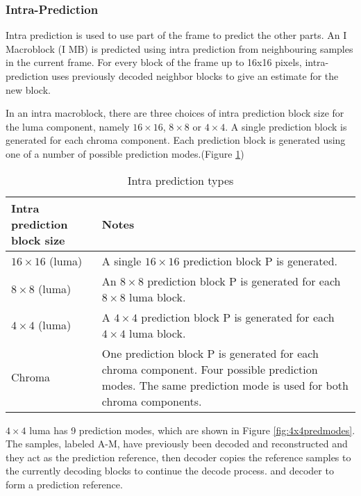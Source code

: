 \documentclass[../main.tex]{subfiles}
\begin{document}
\subsubsection{ Intra-Prediction }

Intra prediction is used to use part of the frame
to predict the other parts. An I Macroblock (I MB) is predicted using intra prediction from neighbouring samples in the current frame. For every block of the frame up to 16x16 pixels, intra-prediction uses previously decoded neighbor blocks to give an estimate for the new
block. 

In an intra macroblock, there are three choices of intra prediction block size for the luma
component, namely $16 \times 16$, $8 \times 8$ or $4 \times 4$. A single prediction block is generated for each
chroma component. Each prediction block is generated using one of a number of possible
prediction modes.(Figure \ref{tab:predtypes}) 

\begin{table}[ht]
\label{tab:predtypes}
\begin{center}       
\begin{tabular}{|l|p{10cm}|} 
\hline
\rule[-1ex]{0pt}{3.5ex}  Intra prediction block size & Notes\\  
\hline
\rule[-1ex]{0pt}{3.5ex}  $16 \times 16$ (luma) &  A single $16 \times 16$ prediction block P is generated.   \\
\hline
\rule[-1ex]{0pt}{3.5ex}  $8 \times 8$ (luma) & An $8 \times 8$ prediction block P is generated for each $8 \times 8$ luma block.
 \\
\hline
\rule[-1ex]{0pt}{3.5ex}  $4 \times 4$ (luma) & A $4 \times 4$ prediction block P is generated for each $4 \times 4$ luma block.   \\
\hline
\rule[-1ex]{0pt}{3.5ex}  Chroma & One prediction block P is generated for each chroma component.
Four possible prediction modes. The same prediction mode is used
for both chroma components.  \\
\hline

\end{tabular}
\end{center}
\caption{Intra prediction types\cite{richardson2004h} } 
\end{table}

$4 \times 4$ luma has 9 prediction modes, which are shown in Figure \ref{fig:4x4predmodes}. The samples, labeled A-M, have previously been decoded and reconstructed and they act as the prediction reference, then decoder copies the reference samples to the currently decoding blocks to continue the decode process.
and decoder to form a prediction reference. 
\end{document}
